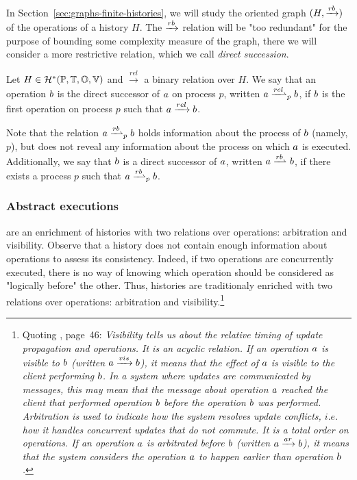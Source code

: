 In Section~\ref{sec:graphs-finite-histories}, we will study the oriented graph $(H,\xrightarrow{rb})$ of the operations of a history $H$. The $\xrightarrow{rb}$ relation will be "too redundant" for the purpose of bounding some complexity measure of the graph, there we will consider a more restrictive relation, which we call \textsl{direct succession}.

\begin{definition}\label{def:successor}
Let $H\in\mathcal{H}^*(\mathbb{P}, \mathbb{T}, \mathbb{O}, \mathbb{V})$ and $\mathrel{\xrightarrow{rel}}$ a binary relation over $H$. We say that an operation $b$ is the direct successor of $a$ on process $p$, written $\opa \succrl{p}{rel} \opb$, if $b$ is the first operation on process $p$ such that $a\mathrel{\xrightarrow{rel}} b$. 
\end{definition}

Note that the relation $\opa\dsucp{p}\opb$ holds information about the process of $b$ (namely, $p$), but does not reveal any information about the process on which $a$ is executed. Additionally, we say that $b$ is a direct successor of $a$, written $\opa\dsuc\opb$, if there exists a process $p$ such that $\opa \dsucp{p} \opb$.



\subsubsection{Abstract executions} are an enrichment of histories with two relations over operations: arbitration and visibility. Observe that a history does not contain enough information about operations to assess its consistency. Indeed, if two operations are concurrently executed, there is no way of knowing which operation should be considered as "logically before" the other. Thus, histories are traditionaly enriched with two relations over operations: arbitration and visibility.\footnote{
Quoting \cite{PrinciplesOfEventualConsistency}, page~46:
\emph{Visibility tells us about the relative timing of update propagation and operations. It is an acyclic relation. If an operation $a$ is visible to $b$ (written $a\xrightarrow{vis}b$), it means that the effect of $a$ is visible to the client performing $b$. In a system where updates are communicated by messages, this may mean that the message about operation $a$ reached the client that performed operation $b$ before the operation $b$ was performed.
 Arbitration is used to indicate how the system resolves update conflicts, $i.e.$ how it handles concurrent updates that do not commute. It is a total order on operations.  If an operation $a$ is arbitrated before $b$ (written $a\xrightarrow{ar}b$), it means that the system considers the operation $a$ to happen earlier than operation $b$.}
}


